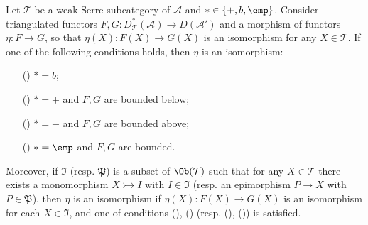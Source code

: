 \begin{proposition}\label{derived category way-out lemma}
Let $\mathcal{T}$ be a weak Serre subcategory of $\mathcal{A}$ and $*\in\{+,b,\emp\}$. Consider triangulated functors $F,G:D^*_\mathcal{T}(\mathcal{A})\to D(\mathcal{A}')$ and a morphism of functors $\eta:F\to G$, so that $\eta(X):F(X)\to G(X)$ is an isomorphism for any $X\in\mathcal{T}$. If one of the following conditions holds, then $\eta$ is an isomorphism:
\begin{enumerate}
    \item[(\rmnum{1})] $*=b$;
    \item[(\rmnum{2})] $*=+$ and $F,G$ are bounded below;
    \item[(\rmnum{3})] $*=-$ and $F,G$ are bounded above;
    \item[(\rmnum{4})] $*=\emp$ and $F,G$ are bounded.
\end{enumerate}
Moreover, if $\mathfrak{I}$ (resp. $\mathfrak{P}$) is a subset of $\Ob(\mathcal{T})$ such that for any $X\in\mathcal{T}$ there exists a monomorphism $X\rightarrowtail I$ with $I\in\mathfrak{I}$ (resp. an epimorphism $P\to X$ with $P\in\mathfrak{P}$), then $\eta$ is an isomorphism if $\eta(X):F(X)\to G(X)$ is an isomorphism for each $X\in\mathfrak{I}$, and one of conditions (), () (resp. (), ()) is satisfied.
\end{proposition}
